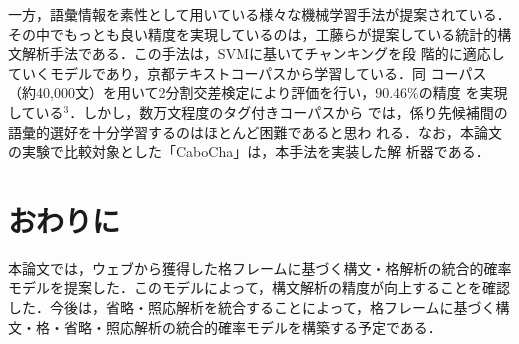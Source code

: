 \documentclass[japanese]{jnlp_1.3e}
\begin{document}
一方，語彙情報を素性として用いている様々な機械学習手法が提案されている．
その中でもっとも良い精度を実現しているのは，工藤らが提案している統計的構
文解析手法である\cite{Kudo2002}．この手法は，SVMに基いてチャンキングを段
階的に適応していくモデルであり，京都テキストコーパスから学習している．同
コーパス（約40,000文）を用いて2分割交差検定により評価を行い，90.46\%の精度
    を実現している\kern0pt$^{3}$．しかし，数万文程度のタグ付きコーパスから
では，係り先候補間の語彙的選好を十分学習するのはほとんど困難であると思わ
れる．なお，本論文の実験で比較対象とした「CaboCha」は，本手法を実装した解
析器である．

\vspace{-0.5\baselineskip}
\section{おわりに}

本論文では，ウェブから獲得した格フレームに基づく構文・格解析の統合的確率
モデルを提案した．このモデルによって，構文解析の精度が向上することを確認
した．今後は，省略・照応解析を統合することによって，格フレームに基づく構
文・格・省略・照応解析の統合的確率モデルを構築する予定である．

\vspace{-0.5\baselineskip}
\end{document}

